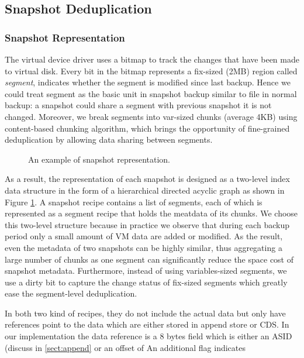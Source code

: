\subsection{Snapshot Deduplication}
\label{sect:dedupe}
\subsubsection{Snapshot Representation}
The virtual device driver uses a bitmap to track the changes 
that have been made to virtual disk.
Every bit in the bitmap represents a fix-sized (2MB) region called \textit{segment}, indicates whether the segment
is modified since last backup. Hence we could treat segment as the basic unit in snapshot backup similar to
file in normal backup: a snapshot could share a segment with previous snapshot it is not changed. 
Moreover, we break 
segments into var-sized chunks (average 4KB) using content-based chunking algorithm,
which brings the opportunity of fine-grained deduplication by
allowing data sharing between segments.

\begin{figure}[htbp]
  \centering
  \caption{An example of snapshot representation.}
  \label{fig:snapshot}
\end{figure}
As a result, the representation of each snapshot is designed as a two-level index data structure 
in the form of a hierarchical directed acyclic graph as shown in Figure \ref{fig:snapshot}.
A snapshot recipe contains a list of segments, each of which is represented as a segment recipe
that holds the meatdata of its chunks. We choose this two-level structure because in practice we
observe that during each backup period only a small amount of VM data are added or modified. 
As the result, even the metadata of two snapshots can be highly similar, 
thus aggregating a large number of chunks as one segment can significantly reduce the space cost of snapshot metadata.
Furthermore, instead of using variables-sized segments, we use a dirty bit to capture the change status of fix-sized
segments which greatly ease the segment-level deduplication.

In both two kind of recipes, 
they do not include the actual data but only have
 references point to the data which are either stored in append store or CDS.
In our implementation the data reference is a 8 bytes field which is either an 
ASID (discuss in \ref{sect:append} or an offset of 
An additional flag indicates

